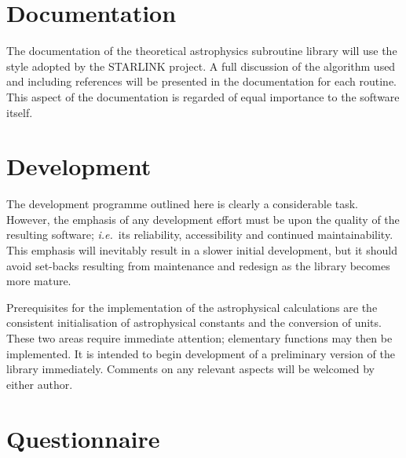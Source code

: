 \section {Documentation}
The documentation of the theoretical astrophysics subroutine library will use
the style adopted by the STARLINK project.
A full discussion of the algorithm used and including
references will be presented in the documentation for each routine.
This aspect of the documentation is regarded of equal importance to the
software itself.

\section {Development}
The development programme outlined here is clearly a considerable task.
However, the emphasis of any development effort must be upon the quality
of the resulting software; {\em i.e.}\ its reliability, accessibility and
continued maintainability.
This emphasis will inevitably result in a slower initial development, but
it should avoid set-backs resulting from maintenance and redesign as the
library becomes more mature.

Prerequisites for the implementation of the astrophysical calculations are
the consistent initialisation of astrophysical constants and the
conversion of units.
These two areas require immediate attention; elementary functions may then be
implemented.
It is intended to begin development of a preliminary version of the library 
immediately.
Comments on any relevant aspects will be welcomed by either author.

\newpage
\appendix
\section {Questionnaire} \label{quest_sect}

